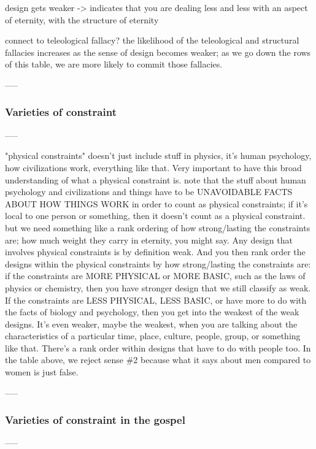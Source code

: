 		design gets weaker -> indicates that you are dealing less and less with an aspect of eternity, with the structure of eternity
		
		connect to teleological fallacy?
			the likelihood of the teleological and structural fallacies increases as the sense of design becomes weaker; as we go down the rows of this table, we are more likely to commit those fallacies.
		
	-----
	\subsubsection{Varieties of constraint}
	-----
	
		"physical constraints" doesn't just include stuff in physics, it's human psychology, how civilizations work, everything like that.
			Very important to have this broad understanding of what a physical constraint is.
			note that the stuff about human psychology and civilizations and things have to be UNAVOIDABLE FACTS ABOUT HOW THINGS WORK in order to count as physical constraints; if it's local to one person or something, then it doesn't count as a physical constraint.
		but we need something like a rank ordering of how strong/lasting the constraints are; how much weight they carry in eternity, you might say.
			Any design that involves physical constraints is by definition weak.
			And you then rank order the designs within the physical constraints by how strong/lasting the constraints are:
				if the constraints are MORE PHYSICAL or MORE BASIC, such as the laws of physics or chemistry, then you have stronger design that we still classify as weak.
				If the constraints are LESS PHYSICAL, LESS BASIC, or have more to do with the facts of biology and psychology, then you get into the weakest of the weak designs.
					It's even weaker, maybe the weakest, when you are talking about the characteristics of a particular time, place, culture, people, group, or something like that.
					There's a rank order within designs that have to do with people too.
					In the table above, we reject sense \#2 because what it says about men compared to women is just false.
	
	-----
	\subsubsection{Varieties of constraint in the gospel}
	-----
	
